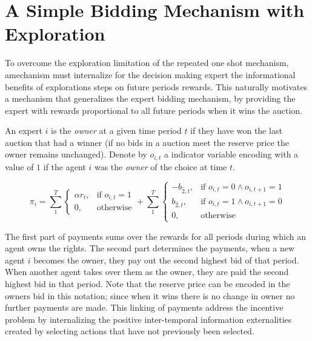 \section{A Simple Bidding Mechanism with Exploration}

To overcome the exploration limitation of the repeated one shot mechanism, amechanism must internalize for the decision making expert the informational benefits of explorations steps on future periods rewards.
This naturally motivates a mechanism that generalizes the expert bidding mechanism, by providing the expert with rewards proportional to all future periods when it wins the auction. 
\begin{mech}

An expert $i$ is the \emph{owner} at a given time period $t$ if they have won the last auction that had a winner (if no bids in a auction meet the reserve price the owner remains unchanged). 
Denote by $o_{i,t}$ a indicator variable encoding with a value of $1$ if the agent $i$ was the \emph{owner} of the choice at time $t$. 

\[
    \pi_i =  \sum_1^T
\begin{cases}
    \alpha r_t ,& \text{if } o_{i,t} = 1\\
    0,              & \text{otherwise}
\end{cases}
+
\sum_1^T
\begin{cases}
     - b_{\hat{2},t} ,& \text{if } o_{i,t} = 0 \land o_{i,t+1} = 1\\
      b_{\hat{2},t} ,& \text{if } o_{i,t}= 1 \land o_{i,t+1} = 0 \\
		0,              & \text{otherwise}
\end{cases}
\]

\end{mech}


The first part of payments sums over the rewards for all periods during which an agent owns the rights.
The second part determines the payments, when a new agent $i$ becomes the owner, they pay out the second highest bid of that period. 
When another agent takes over them as the owner, they are paid the second highest bid in that period.
Note that the reserve price can be encoded in the owners bid in this notation; since when it wins there is no change in owner no further payments are made. 
This linking of payments address the incentive problem by internalizing the positive inter-temporal information externalities created by selecting actions that have not previously been selected.


